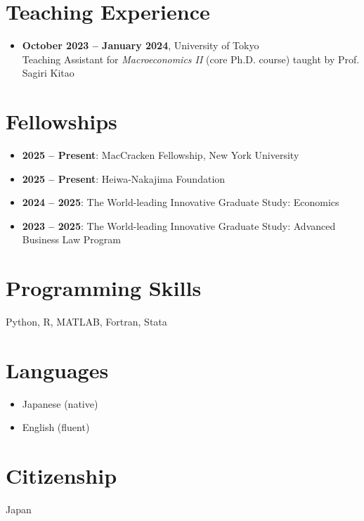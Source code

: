 \documentclass[11pt]{article}
\begin{document}
\section*{Teaching Experience}
\begin{itemize}[leftmargin=1.5em]
  \item \textbf{October 2023 -- January 2024}, University of Tokyo \\
  Teaching Assistant for \textit{Macroeconomics II} (core Ph.D. course) taught by Prof. Sagiri Kitao
\end{itemize}

\section*{Fellowships}
\begin{itemize}[leftmargin=1.5em]
  \item \textbf{2025 -- Present}: MacCracken Fellowship, New York University
  \item \textbf{2025 -- Present}: Heiwa-Nakajima Foundation
  \item \textbf{2024 -- 2025}: The World-leading Innovative Graduate Study: Economics
  \item \textbf{2023 -- 2025}: The World-leading Innovative Graduate Study: Advanced Business Law Program
\end{itemize}

\section*{Programming Skills}
Python, R, MATLAB, Fortran, Stata

\section*{Languages}
\begin{itemize}[leftmargin=1.5em]
  \item Japanese (native)
  \item English (fluent)
\end{itemize}

\section*{Citizenship}
Japan
\end{document}
